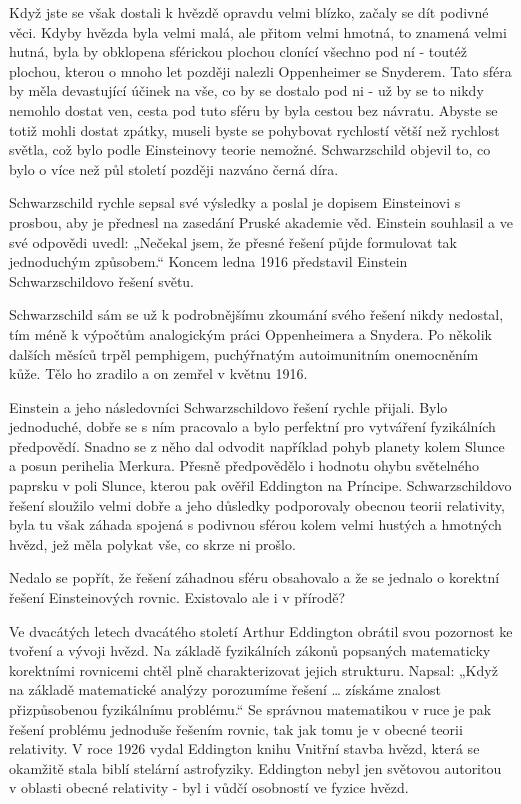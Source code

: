   Když jste se však dostali k hvězdě opravdu velmi blízko, začaly se dít podivné věci. Kdyby hvězda
  byla velmi malá, ale přitom velmi hmotná, to znamená velmi hutná, byla by obklopena sférickou
  plochou clonící všechno pod ní - toutéž plochou, kterou o mnoho let později nalezli Oppenheimer se
  Snyderem. Tato sféra by měla devastující účinek na vše, co by se dostalo pod ni - už by se to
  nikdy nemohlo dostat ven, cesta pod tuto sféru by byla cestou bez návratu. Abyste se totiž mohli
  dostat zpátky, museli byste se pohybovat rychlostí větší než rychlost světla, což bylo podle
  Einsteinovy teorie nemožné. Schwarzschild objevil to, co bylo o více než půl století později
  nazváno černá díra. 
  
  Schwarzschild rychle sepsal své výsledky a poslal je dopisem Einsteinovi s prosbou, aby je
  přednesl na zasedání Pruské akademie věd. Einstein souhlasil a ve své odpovědi uvedl: „Nečekal
  jsem, že přesné řešení půjde formulovat tak jednoduchým způsobem.“ Koncem ledna 1916 představil
  Einstein Schwarzschildovo řešení světu. 
  
  Schwarzschild sám se už k podrobnějšímu zkoumání svého řešení nikdy nedostal, tím méně k výpočtům
  analogickým práci Oppenheimera a Snydera. Po několik dalších měsíců trpěl pemphigem, puchýřnatým
  autoimunitním onemocněním kůže. Tělo ho zradilo a on zemřel v květnu 1916. 
  
  Einstein a jeho následovníci Schwarzschildovo řešení rychle přijali. Bylo jednoduché, dobře se s
  ním pracovalo a bylo perfektní pro vytváření fyzikálních předpovědí. Snadno se z něho dal odvodit
  například pohyb planety kolem Slunce a posun perihelia Merkura. Přesně předpovědělo i hodnotu
  ohybu světelného paprsku v poli Slunce, kterou pak ověřil Eddington na Príncipe. Schwarzschildovo
  řešení sloužilo velmi dobře a jeho důsledky podporovaly obecnou teorii relativity, byla tu však
  záhada spojená s podivnou sférou kolem velmi hustých a hmotných hvězd, jež měla polykat vše, co
  skrze ni prošlo. 
  
  Nedalo se popřít, že řešení záhadnou sféru obsahovalo a že se jednalo o korektní řešení
  Einsteinových rovnic. Existovalo ale i v přírodě? 
  
  Ve dvacátých letech dvacátého století Arthur Eddington obrátil svou pozornost ke tvoření a vývoji
  hvězd. Na základě fyzikálních zákonů popsaných matematicky korektními rovnicemi chtěl plně
  charakterizovat jejich strukturu. Napsal: „Když na základě matematické analýzy porozumíme řešení …
  získáme znalost přizpůsobenou fyzikálnímu problému.“ Se správnou matematikou v ruce je pak řešení
  problému jednoduše řešením rovnic, tak jak tomu je v obecné teorii relativity. V roce 1926 vydal
  Eddington knihu Vnitřní stavba hvězd, která se okamžitě stala biblí stelární astrofyziky.
  Eddington nebyl jen světovou autoritou v oblasti obecné relativity - byl i vůdčí osobností ve
  fyzice hvězd. 
  

